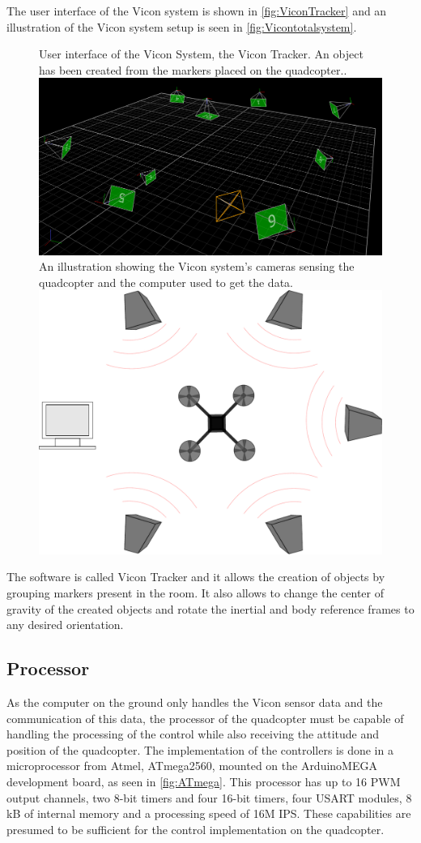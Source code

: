 The user interface of the Vicon system is shown in \autoref{fig:ViconTracker} and an illustration of the Vicon system setup is seen in \autoref{fig:Vicontotalsystem}. 
%
\begin{figure}[H]
	\centering
	\captionbox
	{
		User interface of the Vicon System, the Vicon Tracker. An object has been created from the markers placed on the quadcopter..
		\label{fig:ViconTracker}
	}
	{
	\includegraphics[width=.5\textwidth]{figures/ViconTracker3}
	}
  \hspace{5pt}
  \captionbox
  {
  	An illustration showing the Vicon system's cameras sensing the quadcopter and the computer used to get the data.
  	\label{fig:Vicontotalsystem}
  }
  {
  	\includegraphics[width=.40\textwidth]{figures/system.pdf}
  }
\end{figure}
The software is called Vicon Tracker and it allows the creation of objects by grouping markers present in the room. It also allows to change the center of gravity of the created objects and rotate the inertial and body reference frames to any desired orientation.
\subsection{Processor}
As the computer on the ground only handles the Vicon sensor data and the communication of this data, the processor of the quadcopter must be capable of handling the processing of the control while also receiving the attitude and position of the quadcopter.
The implementation of the controllers is done in a microprocessor from Atmel, ATmega2560, mounted on the ArduinoMEGA development board, as seen in \autoref{fig:ATmega}. This processor has up to 16 PWM output channels, two 8-bit timers and four 16-bit timers, four USART modules, 8 kB of internal memory and a processing speed of 16M IPS. These capabilities are presumed to be sufficient for the control implementation on the quadcopter.\cite{ATmega2560}

